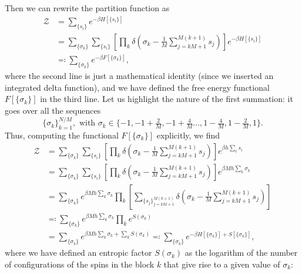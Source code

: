 Then we can rewrite the partition function as
\[
    \begin{aligned}
        \mathcal{Z} & = \sum_{\{s_i\}} e^{-\beta H[\{s_i\}]}                                                                                                                     \\
                    & = \sum_{\{\sigma_k\}} \sum_{\{s_i\}} \left[\prod_{k} \delta\left(\sigma_k - \frac{1}{M} \sum_{j = kM + 1}^{M(k+1)} s_j\right)\right] e^{-\beta H[\{s_i\}]} \\
                    & \eqqcolon \sum_{\{\sigma_k\}} e^{-\beta F[\{\sigma_k\}]},
    \end{aligned}
\]
where the second line is just a mathematical identity (since we inserted an integrated delta function), and we have defined the free energy functional \(F[\{\sigma_k\}]\) in the third line. Let us highlight the nature of the first summation: it goes over all the sequences
\[
    \{\sigma_k\}_{k=1}^{N/M}, \text{ with } \sigma_k \in \{-1, -1 + \tfrac{2}{M}, -1 + \tfrac{4}{M} \dots, 1 - \tfrac{4}{M}, 1 - \tfrac{2}{M}, 1\}.
\]
Thus, computing the functional \(F[\{\sigma_k\}]\) explicitly, we find
\[
    \begin{aligned}
        \mathcal{Z} & = \sum_{\{\sigma_k\}} \sum_{\{s_i\}} \left[\prod_{k} \delta\left(\sigma_k - \frac{1}{M} \sum_{j = kM + 1}^{M(k+1)} s_j\right)\right] e^{\beta h \sum_i s_i}                          \\
                    & = \sum_{\{\sigma_k\}} \sum_{\{s_i\}} \left[\prod_{k} \delta\left(\sigma_k - \frac{1}{M} \sum_{j = kM + 1}^{M(k+1)} s_j\right)\right] e^{\beta M h \sum_k \sigma_k}                   \\
                    & = \sum_{\{\sigma_k\}} e^{\beta M h \sum_k \sigma_k} \prod_k\left[ \sum_{\{s_j\}_{j=kM+1}^{M(k+1)}} \delta\left( \sigma_k - \frac{1}{M} \sum_{j = kM + 1}^{M(k+1)} s_j\right) \right] \\
                    & \eqqcolon \sum_{\{\sigma_k\}} e^{\beta M h \sum_k \sigma_k} \prod_k e^{S(\sigma_k)}                                                                                                  \\
                    & = \sum_{\{\sigma_k\}} e^{\beta M h \sum_k \sigma_k + \sum_k S(\sigma_k)} \eqqcolon \sum_{\{\sigma_k\}} e^{-\beta H[\{\sigma_k\}] + S[\{\sigma_k\}]},
    \end{aligned}
\]
where we have defined an entropic factor \(S(\sigma_k)\) as the logarithm of the number of configurations of the spins in the block \(k\) that give rise to a given value of \(\sigma_k\):
